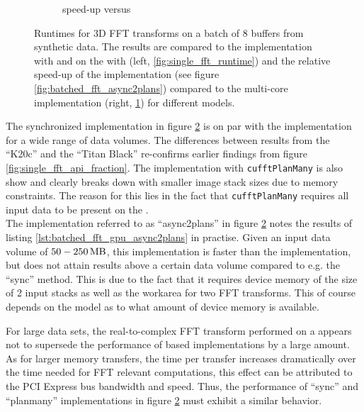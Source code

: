 \begin{figure}[h]
\begin{subfigure}[b]{0.45\textwidth}
    \caption{\gpu{} speed-up versus \cpu{}}
    \label{fig:batched_fft_speed_up}
  \end{subfigure}
  \hfill
  \caption{Runtimes for 3D FFT transforms on a batch of 8 buffers from synthetic data. The results are compared to the \cpu{} implementation with \fftw{} and on the \gpu{} with \cufft{} (left, \ref{fig:single_fft_runtime}) and the relative speed-up of the \gpu{} implementation (see figure \ref{fig:batched_fft_async2plans}) compared to the multi-core \cpu{} implementation (right, \ref{fig:batched_fft_speed_up}) for different \gpu{} models.}
  \label{fig:rt_batched_fft}
\end{figure}


The synchronized implementation in figure \ref{fig:rt_batched_fft} is on par with the \cpu{} implementation for a wide range of data volumes. The differences between results from the ``K20c'' and the ``Titan Black'' \gpu{} re-confirms earlier findings from figure \ref{fig:single_fft_api_fraction}. The implementation with \texttt{cufftPlanMany} is also show and clearly breaks down with smaller image stack sizes due to \gpu{} memory constraints. The reason for this lies in the fact that \texttt{cufftPlanMany} requires all input data to be present on the \gpu{}.\\
 
The implementation referred to as ``async2plans'' in figure \ref{fig:rt_batched_fft} notes the results of listing \ref{lst:batched_fft_gpu_async2plans} in practise. Given an input data volume of $\unit[50-250]{MB}$, this implementation is faster than the \cpu{} implementation, but does not attain results above a certain data volume compared to e.g. the ``sync'' method. This is due to the fact that it requires device memory of the size of 2 input stacks as well as the workarea for two FFT transforms. This of course depends on the \gpu{} model as to what amount of device memory is available. %
\newline

For large data sets, the real-to-complex FFT transform performed on a \gpu{} appears not to supersede the performance of \cpu{} based implementations by a large amount. As for larger memory transfers, the time per transfer increases dramatically over the time needed for FFT relevant computations, this effect can be attributed to the PCI Express bus bandwidth and speed. Thus, the performance of ``sync'' and ``planmany'' implementations in figure \ref{fig:rt_batched_fft} must exhibit a similar behavior.\newline



